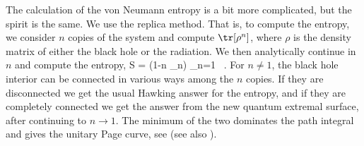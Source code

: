    
   The calculation of the von Neumann entropy is a bit more complicated, but the spirit is the same. We use the replica method. That is, to compute the entropy,  we consider $n$ copies of the system and compute $\tr[\rho^n]$, where $\rho$ is the density matrix of either the black hole or the radiation. We then analytically continue in $n$ and compute the entropy,
\be
S = (1-n \p_n) \log\tr [\rho^n]_{n=1} \ .
\ee
For $n \neq 1$, the black hole interior can be connected in various ways among the $n$ copies. If they are disconnected we get the usual Hawking answer for the entropy, and if they are completely connected we get the answer from the new quantum extremal surface, after continuing to $n \to 1$. The minimum of the two dominates the path integral and gives the unitary Page curve, see \cite{Penington:2019kki,Almheiri:2019qdq} (see also \cite{Marolf:2020xie,Hartman:2020swn}).



